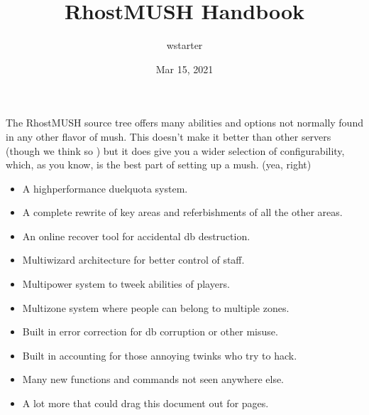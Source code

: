 \documentclass[letterpaper,10pt,english]{sphinxmanual}
\title{RhostMUSH Handbook}
\date{Mar 15, 2021}
\author{wstarter}
\begin{document}
\pagestyle{empty}
\sphinxmaketitle
\pagestyle{plain}
\sphinxtableofcontents
\pagestyle{normal}
\label{\detokenize{index::doc}}


\sphinxAtStartPar
The RhostMUSH source tree offers many abilities and options
not normally found in any other flavor of mush.  This doesn’t
make it better than other servers (though we think so )
but it does give you a wider selection of configurability,
which, as you know, is the best part of setting up a mush.
(yea, right)
\begin{itemize}
\item {} 
\sphinxAtStartPar
A high\sphinxhyphen{}performance duel\sphinxhyphen{}quota system.

\item {} 
\sphinxAtStartPar
A complete rewrite of key areas and referbishments of all the other areas.

\item {} 
\sphinxAtStartPar
An on\sphinxhyphen{}line recover tool for accidental db destruction.

\item {} 
\sphinxAtStartPar
Multi\sphinxhyphen{}wizard architecture for better control of staff.

\item {} 
\sphinxAtStartPar
Multi\sphinxhyphen{}power system to tweek abilities of players.

\item {} 
\sphinxAtStartPar
Multi\sphinxhyphen{}zone system where people can belong to multiple zones.

\item {} 
\sphinxAtStartPar
Built in error correction for db corruption or other misuse.

\item {} 
\sphinxAtStartPar
Built in accounting for those annoying twinks who try to hack.

\item {} 
\sphinxAtStartPar
Many new functions and commands not seen anywhere else.

\item {} 
\sphinxAtStartPar
A lot more that could drag this document out for pages.

\end{itemize}
\end{document}
